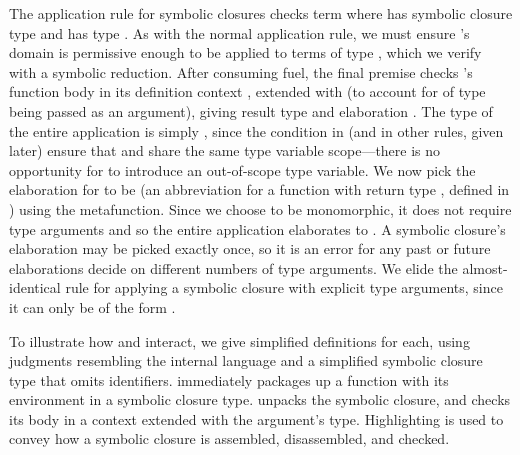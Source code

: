 The application rule for symbolic closures
\ltiSCAppInfClosure
checks term \ltiapp{\ltiF{}}{\ltiE{}}
where \ltiF{} has symbolic closure type
                      {\ltiClosureWithStkID{\ltiEnvp{}}
                                           {\ltiClosureID{}}
                                           {\ltiufun{\ltivar{}}{\ltiEp{}}}}
                                           and 
\ltiE{} has type \ltiT{}.
As with the normal application rule,
we must ensure \ltiF{}'s domain is permissive enough to be
applied to terms of type \ltiT{}, which
we verify with a symbolic reduction.
After consuming fuel, the final premise checks \ltiClosureID{}'s
function body \ltiEp{} in its definition context \ltiEnvp{},
extended with \hastype{\ltivar{}}{\ltiT{}} (to account for
\ltiE{} of type \ltiT{} being passed as an argument), giving result type \ltiS{}
and elaboration \ltiFpp{}.
The type of the entire application is simply \ltiS{}, since
the condition in \ltiSCAbs (and in other rules, given later) ensure that
\ltiEnv{} and \ltiEnvp{} share the same type variable scope---there
is no opportunity for \ltiS{} to introduce an out-of-scope type variable.
We now pick the elaboration for \ltiClosureID{}
to be
{\ltifuntparamargrettype
                                 {}
                                 {\ltivar{}}
                                 {\ltiT{}}
                                 {\ltiS{}}
                                 {\ltiFpp{}}}
(an abbreviation for a function with return type \ltiS{}, defined in
)
using the \ltiupdateClosureCacheSinglesymbol metafunction.
Since we choose \ltiClosureID{} to be monomorphic, it does
not require type arguments
and so
the entire application elaborates to
                      {\ltiappinst{\ltiFp{}}
                                  {}
                                  {\ltiEpp{}}}.
A symbolic closure's elaboration may be picked exactly once,
so it is an error for any past or future elaborations decide
on different numbers of type arguments.
We elide the almost-identical rule \ltiSCAppClosure for applying a symbolic closure
with explicit type arguments,
since it can only be of the form \ltiappinst{\ltiF{}}{}{\ltiE{}}.

To illustrate how \ltiSCUAbs and \ltiSCAppInfClosure interact,
we give simplified definitions for each, using judgments resembling the internal language
and a simplified symbolic closure
type \ltiClosure{\ltiEnv{}}{\ltiufun{\ltivar{}}{\ltiF{}}} that omits identifiers.
\ltiSimpUAbs immediately packages up a function with its environment in a symbolic closure type.
\ltiSimpAppInfClosure unpacks the symbolic closure, and checks its body in a context extended
with the argument's type.
Highlighting is used to convey how a symbolic closure is assembled, disassembled, and checked.

